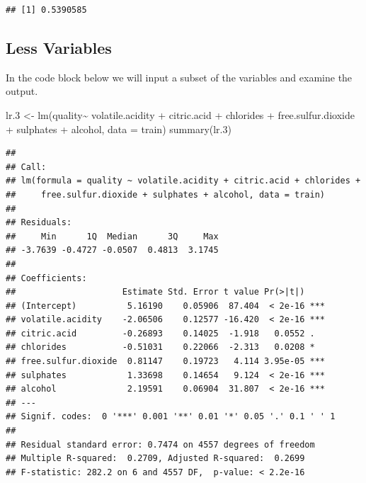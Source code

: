 \documentclass[
]{book}
\newenvironment{Shaded}{\begin{snugshade}}{\end{snugshade}}
\newcommand{\AttributeTok}[1]{\textcolor[rgb]{0.77,0.63,0.00}{#1}}
\newcommand{\FloatTok}[1]{\textcolor[rgb]{0.00,0.00,0.81}{#1}}
\newcommand{\FunctionTok}[1]{\textcolor[rgb]{0.00,0.00,0.00}{#1}}
\newcommand{\NormalTok}[1]{#1}
\newcommand{\OtherTok}[1]{\textcolor[rgb]{0.56,0.35,0.01}{#1}}
\newcommand{\SpecialCharTok}[1]{\textcolor[rgb]{0.00,0.00,0.00}{#1}}
\begin{document}
\begin{Shaded}
\end{Shaded}

\begin{verbatim}
## [1] 0.5390585
\end{verbatim}

\hypertarget{less-variables}{%
\subsection{Less Variables}\label{less-variables}}

In the code block below we will input a subset of the variables and examine the output.

\begin{Shaded}
\begin{Highlighting}[]
\NormalTok{lr}\FloatTok{.3} \OtherTok{\textless{}{-}} \FunctionTok{lm}\NormalTok{(quality}\SpecialCharTok{\textasciitilde{}}\NormalTok{ volatile.acidity }\SpecialCharTok{+}\NormalTok{ citric.acid }\SpecialCharTok{+}\NormalTok{ chlorides }\SpecialCharTok{+}\NormalTok{ free.sulfur.dioxide }\SpecialCharTok{+}\NormalTok{ sulphates }\SpecialCharTok{+}\NormalTok{ alcohol, }\AttributeTok{data =}\NormalTok{ train)}
\FunctionTok{summary}\NormalTok{(lr}\FloatTok{.3}\NormalTok{)}
\end{Highlighting}
\end{Shaded}

\begin{verbatim}
## 
## Call:
## lm(formula = quality ~ volatile.acidity + citric.acid + chlorides + 
##     free.sulfur.dioxide + sulphates + alcohol, data = train)
## 
## Residuals:
##     Min      1Q  Median      3Q     Max 
## -3.7639 -0.4727 -0.0507  0.4813  3.1745 
## 
## Coefficients:
##                     Estimate Std. Error t value Pr(>|t|)    
## (Intercept)          5.16190    0.05906  87.404  < 2e-16 ***
## volatile.acidity    -2.06506    0.12577 -16.420  < 2e-16 ***
## citric.acid         -0.26893    0.14025  -1.918   0.0552 .  
## chlorides           -0.51031    0.22066  -2.313   0.0208 *  
## free.sulfur.dioxide  0.81147    0.19723   4.114 3.95e-05 ***
## sulphates            1.33698    0.14654   9.124  < 2e-16 ***
## alcohol              2.19591    0.06904  31.807  < 2e-16 ***
## ---
## Signif. codes:  0 '***' 0.001 '**' 0.01 '*' 0.05 '.' 0.1 ' ' 1
## 
## Residual standard error: 0.7474 on 4557 degrees of freedom
## Multiple R-squared:  0.2709, Adjusted R-squared:  0.2699 
## F-statistic: 282.2 on 6 and 4557 DF,  p-value: < 2.2e-16
\end{verbatim}
\end{document}
